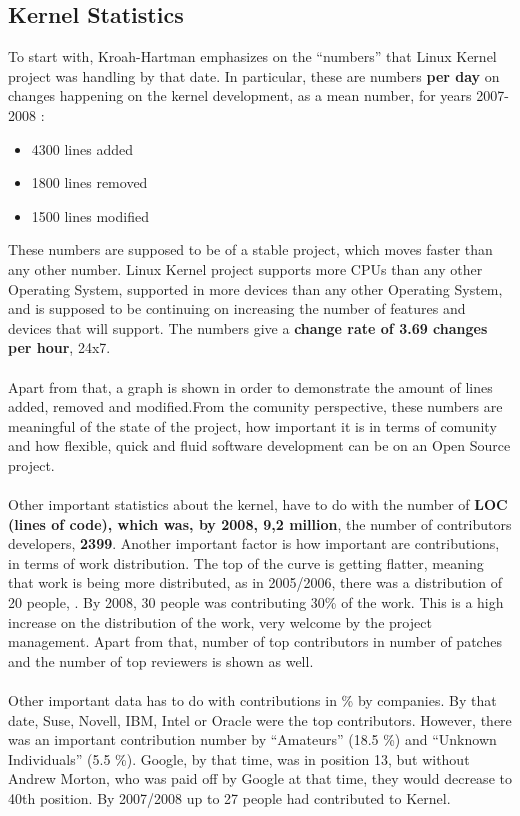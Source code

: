 \documentclass[11pt]{article}
\begin{document}
\subsection{Kernel Statistics}
To start with, Kroah-Hartman emphasizes on the ``numbers'' that Linux Kernel project was handling by that date. In particular, these are numbers \textbf{per day} on changes happening on the kernel development, as a mean number, for years 2007-2008 :
\begin{itemize}\itemsep0pt
\item{4300 lines added}
\item{1800 lines removed}
\item{1500 lines modified}
\end{itemize}
These numbers are supposed to be of a stable project, which moves faster than any other number. Linux Kernel project supports more CPUs than any other Operating System, supported in more devices than any other Operating System, and is supposed to be continuing on increasing the number of features and devices that will support. The numbers give a \textbf{change rate of 3.69 changes per hour}, 24x7.\\
\\
Apart from that, a graph is shown in order to demonstrate the amount of lines added, removed and modified.From the comunity perspective, these numbers are meaningful of the state of the project, how important it is in terms of comunity and how flexible, quick and fluid software development can be on an Open Source project.\\
\\
Other important statistics about the kernel, have to do with the number of \textbf{LOC (lines of code), which was, by 2008, 9,2 million}, the number of contributors developers, \textbf{2399}. Another important factor is how important are contributions, in terms of work distribution. The top of the curve is getting flatter, meaning that work is being more distributed, as in 2005/2006, there was a distribution of 20 people, . By 2008, 30 people was contributing 30\% of the work. This is a high increase on the distribution of the work, very welcome by the project management. Apart from that, number of top contributors in number of patches and the number of top reviewers is shown as well.\\
\\
Other important data has to do with contributions in \% by companies. By that date, Suse, Novell, IBM, Intel or Oracle were the top contributors. However, there was an important contribution number by ``Amateurs'' (18.5 \%) and ``Unknown Individuals'' (5.5 \%). Google, by that time, was in position 13, but without Andrew Morton, who was paid off by Google at that time, they would decrease to 40th position. By 2007/2008 up to 27 people had contributed to Kernel.
\end{document}
